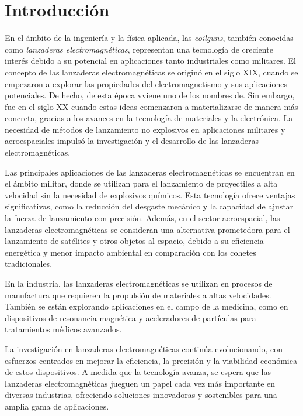 \section{Introducción}


En el ámbito de la ingeniería y la física aplicada, las \textit{coilguns}, también conocidas como \textit{lanzaderas electromagnéticas}, representan una tecnología de creciente interés debido a su potencial en aplicaciones tanto industriales como militares. El concepto de las lanzaderas electromagnéticas se originó en el siglo XIX, cuando se empezaron a explorar las propiedades del electromagnetismo y sus aplicaciones potenciales. De hecho, de esta época vviene uno de los nombres de. Sin embargo, fue en el siglo XX cuando estas ideas comenzaron a materializarse de manera más concreta, gracias a los avances en la tecnología de materiales y la electrónica. La necesidad de métodos de lanzamiento no explosivos en aplicaciones militares y aeroespaciales impulsó la investigación y el desarrollo de las lanzaderas electromagnéticas.

Las principales aplicaciones de las lanzaderas electromagnéticas se encuentran en el ámbito militar, donde se utilizan para el lanzamiento de proyectiles a alta velocidad sin la necesidad de explosivos químicos. Esta tecnología ofrece ventajas significativas, como la reducción del desgaste mecánico y la capacidad de ajustar la fuerza de lanzamiento con precisión. Además, en el sector aeroespacial, las lanzaderas electromagnéticas se consideran una alternativa prometedora para el lanzamiento de satélites y otros objetos al espacio, debido a su eficiencia energética y menor impacto ambiental en comparación con los cohetes tradicionales.

En la industria, las lanzaderas electromagnéticas se utilizan en procesos de manufactura que requieren la propulsión de materiales a altas velocidades. También se están explorando aplicaciones en el campo de la medicina, como en dispositivos de resonancia magnética y aceleradores de partículas para tratamientos médicos avanzados.

La investigación en lanzaderas electromagnéticas continúa evolucionando, con esfuerzos centrados en mejorar la eficiencia, la precisión y la viabilidad económica de estos dispositivos. A medida que la tecnología avanza, se espera que las lanzaderas electromagnéticas jueguen un papel cada vez más importante en diversas industrias, ofreciendo soluciones innovadoras y sostenibles para una amplia gama de aplicaciones.

